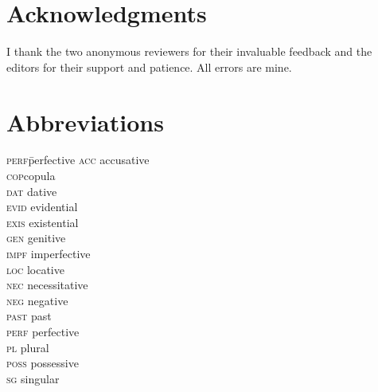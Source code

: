 \documentclass[output=paper]{langsci/langscibook}
\begin{document}
\section*{Acknowledgments}

I thank the two anonymous reviewers for their invaluable feedback and the editors for their support and patience. 
All errors are mine.

\section*{Abbreviations}
\begin{multicols}{2}
\begin{tabbing}
\textsc{perf}\hspace{1ex}\= perfective\kill
\textsc{acc}\> accusative\\ 
\textsc{cop}\>copula\\ 
\textsc{dat}\> dative\\ 
\textsc{evid}\> evidential\\ 
\textsc{exis}\> existential\\
\textsc{gen}\> genitive\\ 
\textsc{impf}\> imperfective\\ 
\textsc{loc}\> locative\\ 
\textsc{nec}\> necessitative\\ 
\textsc{neg}\> negative\\ 
\textsc{past}\> past\\ 
\textsc{perf}\> perfective\\ 
\textsc{pl}\> plural\\ 
\textsc{poss}\> possessive\\ 
\textsc{sg}\> singular\\
\end{tabbing}
\end{multicols}

{\sloppy\printbibliography[heading=subbibliography,notkeyword=this]}
\end{document}
